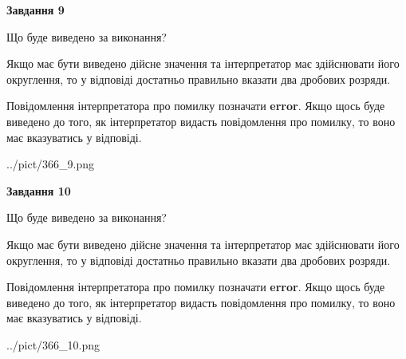 \documentclass[12pt, ukrainian]{article}
\begin{document}
{\begin {Large}
{\begin {center}\textbf{Завдання 9}\end {center}}\par
Що буде виведено за виконання? \par

Якщо має бути виведено дійсне значення та інтерпретатор має здійснювати його округлення, 
то у відповіді достатньо правильно вказати два дробових розряди.

Повідомлення інтерпретатора про помилку позначати \textbf{error}.
Якщо щось буде виведено до того, як інтерпретатор видасть повідомлення про помилку, 
то воно має вказуватись у відповіді. \par

\begin{center}
	{../pict/366_9.png}
\end{center}
\newpage

{\begin {center}\textbf{Завдання 10}\end {center}}\par
Що буде виведено за виконання? \par

Якщо має бути виведено дійсне значення та інтерпретатор має здійснювати його округлення, 
то у відповіді достатньо правильно вказати два дробових розряди.

Повідомлення інтерпретатора про помилку позначати \textbf{error}.
Якщо щось буде виведено до того, як інтерпретатор видасть повідомлення про помилку, 
то воно має вказуватись у відповіді. \par

\begin{center}
	{../pict/366_10.png}
\end{center}
\newpage

\end {Large}}
\end{document}
